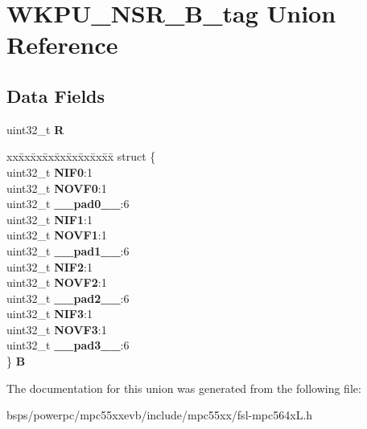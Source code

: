 \hypertarget{unionWKPU__NSR__32B__tag}{}\section{W\+K\+P\+U\+\_\+\+N\+S\+R\+\_\+B\+\_\+tag Union Reference}
\label{unionWKPU__NSR__32B__tag}
\subsection*{Data Fields}
\begin{DoxyCompactItemize}
\item 
\mbox{\label{unionWKPU__NSR__32B__tag_a8954f050056b5682b1df8ce9aa1f829e}} 
uint32\+\_\+t {\bfseries R}
\item 
\mbox{\label{unionWKPU__NSR__32B__tag_a5886e9298229703126791bb7c4effcd3}} 
\begin{tabbing}
xx\=xx\=xx\=xx\=xx\=xx\=xx\=xx\=xx\=\kill
struct \{\\
\>uint32\_t {\bfseries NIF0}:1\\
\>uint32\_t {\bfseries NOVF0}:1\\
\>uint32\_t {\bfseries \_\_pad0\_\_}:6\\
\>uint32\_t {\bfseries NIF1}:1\\
\>uint32\_t {\bfseries NOVF1}:1\\
\>uint32\_t {\bfseries \_\_pad1\_\_}:6\\
\>uint32\_t {\bfseries NIF2}:1\\
\>uint32\_t {\bfseries NOVF2}:1\\
\>uint32\_t {\bfseries \_\_pad2\_\_}:6\\
\>uint32\_t {\bfseries NIF3}:1\\
\>uint32\_t {\bfseries NOVF3}:1\\
\>uint32\_t {\bfseries \_\_pad3\_\_}:6\\
\} {\bfseries B}\\

\end{tabbing}\end{DoxyCompactItemize}


The documentation for this union was generated from the following file\+:\begin{DoxyCompactItemize}
\item 
bsps/powerpc/mpc55xxevb/include/mpc55xx/fsl-\/mpc564x\+L.\+h\end{DoxyCompactItemize}
